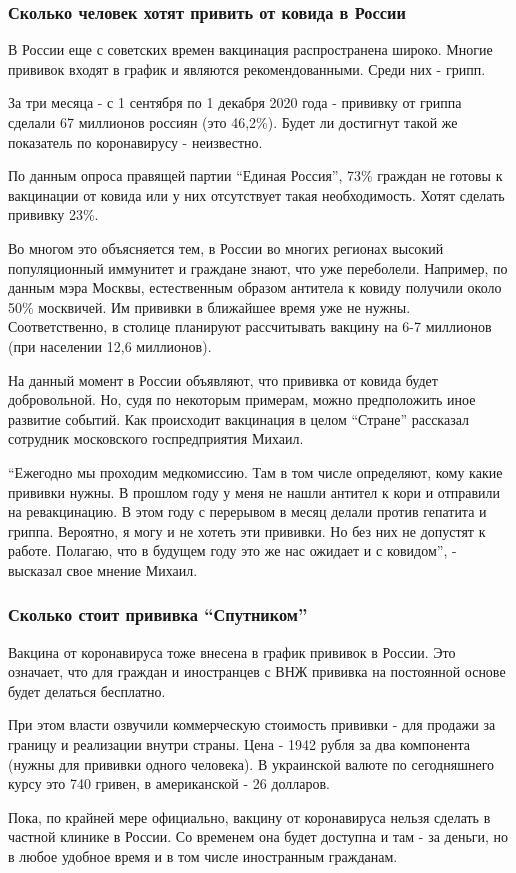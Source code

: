 \subsubsection{Сколько человек хотят привить от ковида в России}

В России еще с советских времен вакцинация распространена широко. Многие
прививок входят в график и являются рекомендованными. Среди них - грипп. 

За три месяца - с 1 сентября по 1 декабря 2020 года - прививку от гриппа
сделали 67 миллионов россиян (это 46,2\%). Будет ли достигнут такой же
показатель по коронавирусу - неизвестно. 

По данным опроса правящей партии \enquote{Единая Россия}, 73\% граждан не готовы к
вакцинации от ковида или у них отсутствует такая необходимость. Хотят сделать
прививку 23\%. 

Во многом это объясняется тем, в России во многих регионах высокий
популяционный иммунитет и граждане знают, что уже переболели. Например, по
данным мэра Москвы, естественным образом антитела к ковиду получили около 50\%
москвичей. Им прививки в ближайшее время уже не нужны. Соответственно, в
столице планируют рассчитывать вакцину на 6-7 миллионов (при населении 12,6
миллионов). 

На данный момент в России объявляют, что прививка от ковида будет добровольной.
Но, судя по некоторым примерам, можно предположить иное развитие событий. Как
происходит вакцинация в целом \enquote{Стране} рассказал сотрудник московского
госпредприятия Михаил. 

\enquote{Ежегодно мы проходим медкомиссию. Там в том числе определяют, кому какие
прививки нужны. В прошлом году у меня не нашли антител к кори и отправили на
ревакцинацию. В этом году с перерывом в месяц делали против гепатита и гриппа.
Вероятно, я могу и не хотеть эти прививки. Но без них не допустят к работе.
Полагаю, что в будущем году это же нас ожидает и с ковидом}, - высказал свое
мнение Михаил. 

\subsubsection{Сколько стоит прививка \enquote{Спутником}}

Вакцина от коронавируса тоже внесена в график прививок в России. Это означает,
что для граждан и иностранцев с ВНЖ прививка на постоянной основе будет
делаться бесплатно. 

При этом власти озвучили коммерческую стоимость прививки - для продажи за
границу и реализации внутри страны. Цена - 1942 рубля за два компонента (нужны
для прививки одного человека). В украинской валюте по сегодняшнего курсу это
740 гривен, в американской - 26 долларов. 

Пока, по крайней мере официально, вакцину от коронавируса нельзя сделать в
частной клинике в России. Со временем она будет доступна и там - за деньги, но
в любое удобное время и в том числе иностранным гражданам. 
